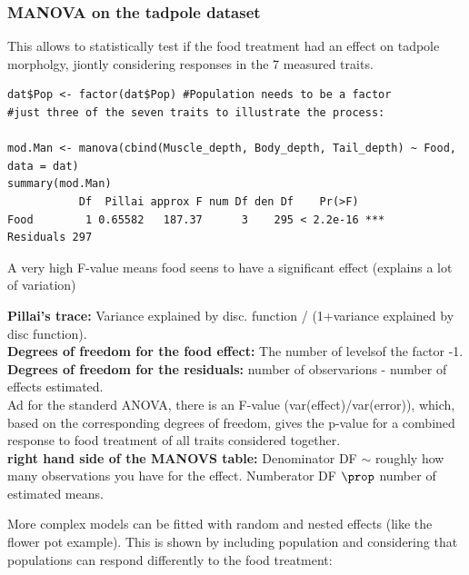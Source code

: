 \documentclass{article}
\begin{document}
\subsubsection{MANOVA on the tadpole dataset}
This allows to statistically test if the food treatment had an effect on tadpole morpholgy, jiontly considering responses in the 7 measured traits. 

\begin{lstlisting}
dat$Pop <- factor(dat$Pop) #Population needs to be a factor 
#just three of the seven traits to illustrate the process:

mod.Man <- manova(cbind(Muscle_depth, Body_depth, Tail_depth) ~ Food, data = dat)
summary(mod.Man)
           Df  Pillai approx F num Df den Df    Pr(>F)    
Food        1 0.65582   187.37      3    295 < 2.2e-16 ***
Residuals 297                                             
\end{lstlisting}

A very high F-value means food seens to have a significant effect (explains a lot of variation)

\textbf{Pillai's trace:} Variance explained by disc. function / (1+variance explained by disc function). \\ 
\textbf{Degrees of freedom for the food effect:} The number of levelsof the factor -1.\\
\textbf{Degrees of freedom for the residuals:} number of observarions - number of effects estimated. \\
Ad for the standerd ANOVA, there is an F-value (var(effect)/var(error)), which, based on the corresponding degrees of freedom, gives the p-value for a combined response to food treatment of all traits considered together.\\
\textbf{right hand side of the MANOVS table:} Denominator DF $\sim$ roughly how many observations you have for the effect. Numberator DF $\prop$ number of estimated means.\par 
More complex models can be fitted with random and nested effects (like the flower pot example). This is shown by including population and considering that populations can respond differently to the food treatment:
\end{document}
